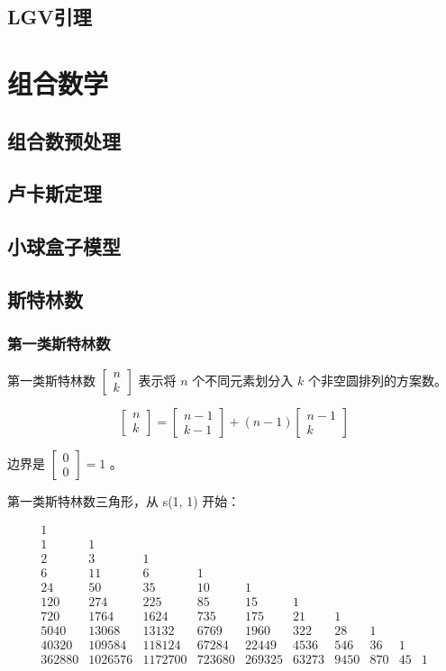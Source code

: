 \documentclass{article}
\begin{document}
\subsection{LGV引理}

\section{组合数学}
\subsection{组合数预处理}
\subsection{卢卡斯定理}
\subsection{小球盒子模型}
\subsection{斯特林数}
\subsubsection{第一类斯特林数}

第一类斯特林数 $\begin{bmatrix}n\\k\end{bmatrix}$ 表示将 $n$ 个不同元素划分入 $k$ 个非空圆排列的方案数。

$$
\begin{bmatrix}
n \\ k
\end{bmatrix}
=
\begin{bmatrix}
n-1 \\ k-1
\end{bmatrix}
+
(n-1)\begin{bmatrix}
n-1 \\ k
\end{bmatrix}
$$

边界是 $\begin{bmatrix}0\\0\end{bmatrix}=1$ 。

第一类斯特林数三角形，从 s(1, 1) 开始：

$$
\begin{matrix}
1 \\
1 & 1 \\
2 & 3 & 1 \\
6 & 11 & 6 & 1 \\
24 & 50 & 35 & 10 & 1 \\
120 & 274 & 225 & 85 & 15 & 1 \\
720 & 1764 & 1624 & 735 & 175 & 21 & 1 \\
5040 & 13068 & 13132 & 6769 & 1960 & 322 & 28 & 1 \\
40320 & 109584 & 118124 & 67284 & 22449 & 4536 & 546 & 36 & 1 \\
362880 & 1026576 & 1172700 & 723680 & 269325 & 63273 & 9450 & 870 & 45 & 1 \\
\end{matrix}
$$
\end{document}
